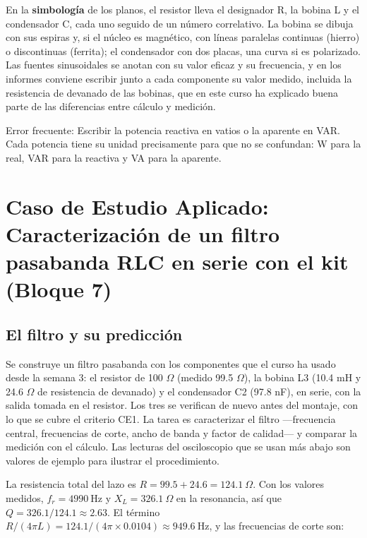 \documentclass[11pt,letterpaper]{article}
\begin{document}
En la \textbf{simbología} de los planos, el resistor lleva el designador R, la bobina L y el condensador C, cada uno seguido de un número correlativo. La bobina se dibuja con sus espiras y, si el núcleo es magnético, con líneas paralelas continuas (hierro) o discontinuas (ferrita); el condensador con dos placas, una curva si es polarizado. Las fuentes sinusoidales se anotan con su valor eficaz y su frecuencia, y en los informes conviene escribir junto a cada componente su valor medido, incluida la resistencia de devanado de las bobinas, que en este curso ha explicado buena parte de las diferencias entre cálculo y medición.

\begin{nota}{Error frecuente:}
Escribir la potencia reactiva en vatios o la aparente en VAR. Cada potencia tiene su unidad precisamente para que no se confundan: W para la real, VAR para la reactiva y VA para la aparente.
\end{nota}

\section{Caso de Estudio Aplicado: Caracterización de un filtro pasabanda RLC en serie con el kit (Bloque 7)}

\subsection{El filtro y su predicción}

Se construye un filtro pasabanda con los componentes que el curso ha usado desde la semana 3: el resistor de 100 \ensuremath{\Omega} (medido 99.5 \ensuremath{\Omega}), la bobina L3 (10.4 mH y 24.6 \ensuremath{\Omega} de resistencia de devanado) y el condensador C2 (97.8 nF), en serie, con la salida tomada en el resistor. Los tres se verifican de nuevo antes del montaje, con lo que se cubre el criterio CE1. La tarea es caracterizar el filtro ---frecuencia central, frecuencias de corte, ancho de banda y factor de calidad--- y comparar la medición con el cálculo. Las lecturas del osciloscopio que se usan más abajo son valores de ejemplo para ilustrar el procedimiento.

La resistencia total del lazo es $R = 99.5 + 24.6 = 124.1\ \Omega$. Con los valores medidos, $f_r = 4990\ \text{Hz}$ y $X_L = 326.1\ \Omega$ en la resonancia, así que $Q = 326.1/124.1 \approx 2.63$. El término $R/(4\pi L) = 124.1/(4\pi \times 0.0104) \approx 949.6\ \text{Hz}$, y las frecuencias de corte son:
\end{document}
